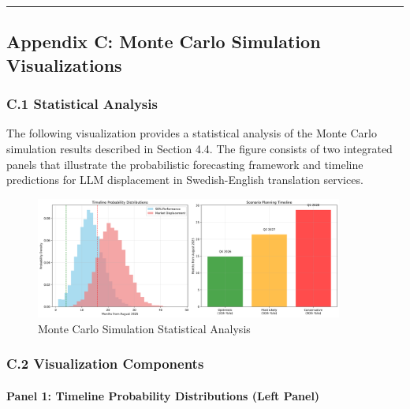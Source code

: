 \documentclass[12pt,a4paper]{article}
\begin{document}
{{{{{\begin{center}\rule{0.5\linewidth}{0.5pt}\end{center}

\hypertarget{appendix-c-monte-carlo-simulation-visualizations}{%
\subsection{Appendix C: Monte Carlo Simulation Visualizations}\label{appendix-c-monte-carlo-simulation-visualizations}}

\hypertarget{statistical-analysis}{%
\subsubsection{C.1 Statistical Analysis}\label{statistical-analysis}}

The following visualization provides a statistical analysis of the Monte Carlo simulation results described in Section 4.4. The figure consists of two integrated panels that illustrate the probabilistic forecasting framework and timeline predictions for LLM displacement in Swedish-English translation services.

\begin{figure}[htbp]
\centering
\includegraphics[width=0.9\textwidth]{monte_carlo_results.png}
\caption{Monte Carlo Simulation Statistical Analysis}
\label{fig:monte-carlo-results}
\end{figure}

\hypertarget{visualization-components}{%
\subsubsection{C.2 Visualization Components}\label{visualization-components}}

\hypertarget{panel-1-timeline-probability-distributions}{%
\paragraph{Panel 1: Timeline Probability Distributions (Left Panel)}\label{panel-1-timeline-probability-distributions}}

}}}}}
\end{document}
